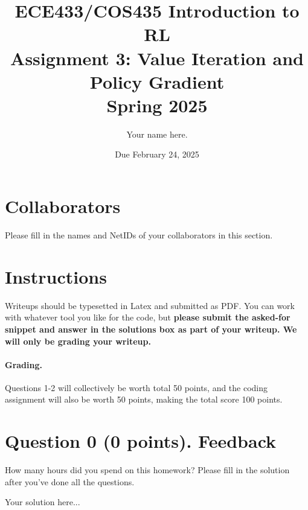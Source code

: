 \documentclass[12pt]{article}
\date{Due February 24, 2025}
\author{\begin{fillme}[width=0.3\textwidth]
 Your name here.
\end{fillme}} %
\title{ECE433/COS435 Introduction to RL\\
  Assignment 3: Value Iteration and Policy Gradient\\
  Spring 2025\\
}
\begin{document}
  \maketitle
  \section*{Collaborators}
\begin{fillme}
 Please fill in the names and NetIDs of your collaborators in this section.
\end{fillme}

\section*{Instructions}
Writeups should be typesetted in Latex and submitted as PDF. You can work with whatever tool you like for the code, but \textbf{please submit the asked-for snippet and answer in the solutions box as part of your writeup. We will only be grading your writeup.}

\paragraph{Grading.} 
Questions 1-2 will collectively be worth total 50 points, and the coding assignment will also be worth 50 points, making the total score 100 points.

\section*{Question 0 (0 points). Feedback}
How many hours did you spend on this homework? Please fill in the solution after you've done all the questions.
\begin{solution}
    Your solution here...
\end{solution}
\end{document}
